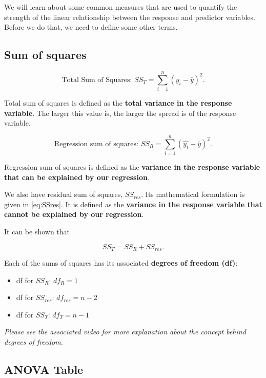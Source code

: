 \documentclass[
]{book}
\providecommand{\tightlist}{%
  \setlength{\itemsep}{0pt}\setlength{\parskip}{0pt}}
\begin{document}
We will learn about some common measures that are used to quantify the strength of the linear relationship between the response and predictor variables. Before we do that, we need to define some other terms.

\subsection{Sum of squares}\label{sum-of-squares}

\begin{equation} 
\text{Total Sum of Squares: } SS_T = \sum\limits_{i=1}^{n} (y_i - \bar{y})^{2}.
\label{eq:SST}
\end{equation}

Total sum of squares is defined as the \textbf{total variance in the response variable}. The larger this value is, the larger the spread is of the response variable.

\begin{equation} 
\text{Regression sum of squares: } SS_R = \sum\limits_{i=1}^{n} (\hat{y_i} - \bar{y})^{2}.
\label{eq:SSR}
\end{equation}

Regression sum of squares is defined as the \textbf{variance in the response variable that can be explained by our regression}.

We also have residual sum of squares, \(SS_{res}\). Its mathematical formulation is given in \eqref{eq:SSres}. It is defined as the \textbf{variance in the response variable that cannot be explained by our regression}.

It can be shown that

\begin{equation}
SS_T = SS_R + SS_{res}.
\label{eq:SS}
\end{equation}

Each of the sums of squares has its associated \textbf{degrees of freedom (df)}:

\begin{itemize}
\tightlist
\item
  df for \(SS_R\): \(df_R = 1\)
\item
  df for \(SS_{res}\): \(df_{res} = n-2\)
\item
  df for \(SS_T\): \(df_T = n-1\)
\end{itemize}

\emph{Please see the associated video for more explanation about the concept behind degrees of freedom.}

\subsection{ANOVA Table}\label{anova-table}
\end{document}
